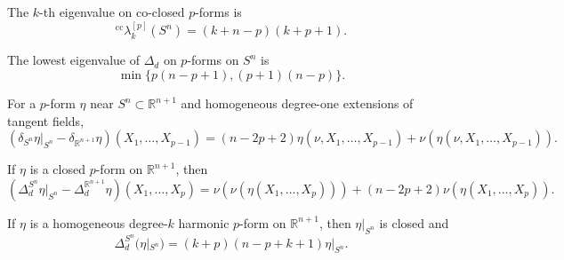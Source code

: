 \begin{theorem}
\label{thm:chow-iv-k23-coclosed-eigenforms}


The $k$-th eigenvalue on co-closed $p$-forms is
\[
{}^{\mathrm{cc}}\lambda_k^{[p]}(S^n)=(k+n-p)(k+p+1).
\]
\end{theorem}

\begin{corollary}
\label{cor:chow-iv-k24-lowest-p-form-eigenvalue}


The lowest eigenvalue of $\Delta_d$ on $p$-forms on $S^n$ is
\[
\min\{p(n-p+1),(p+1)(n-p)\}.
\]
\end{corollary}

\begin{lemma}
\label{lem:chow-iv-k25-codifferential-sphere}

For a $p$-form $\eta$ near $S^n\subset\mathbb R^{n+1}$ and homogeneous degree-one
extensions of tangent fields,
\[
(\delta_{S^n}\eta|_{S^n}-\delta_{\mathbb R^{n+1}}\eta)(X_1,\ldots,X_{p-1})
=(n-2p+2)\eta(\nu,X_1,\ldots,X_{p-1})
 +\nu\!\left(\eta(\nu,X_1,\ldots,X_{p-1})\right).
\]
\end{lemma}

\begin{lemma}
\label{lem:chow-iv-k26-hodge-laplacian-sphere}


If $\eta$ is a closed $p$-form on $\mathbb R^{n+1}$, then
\[
(\Delta_d^{S^n}\eta|_{S^n}-\Delta_d^{\mathbb R^{n+1}}\eta)(X_1,\ldots,X_p)
=\nu\!\left(\nu(\eta(X_1,\ldots,X_p))\right)
 +(n-2p+2)\nu(\eta(X_1,\ldots,X_p)).
\]
\end{lemma}

\begin{lemma}
\label{lem:chow-iv-k27-homogeneous-closed-forms}


If $\eta$ is a homogeneous degree-$k$ harmonic $p$-form on $\mathbb R^{n+1}$,
then $\eta|_{S^n}$ is closed and
\[
\Delta_d^{S^n}(\eta|_{S^n})=(k+p)(n-p+k+1)\eta|_{S^n}.
\]
\end{lemma}

